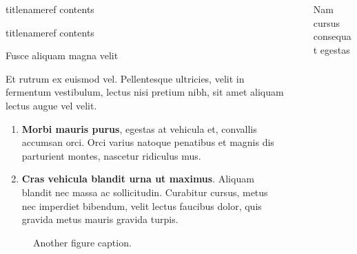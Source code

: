 \documentclass[final]{beamer}
\newlength{\sepwidth}
\newlength{\colwidth}
\newcommand{\separatorcolumn}{\begin{column}{\sepwidth}\end{column}}
\begin{document}
\begin{frame}[t]
\begin{columns}[t]
\begin{column}{\colwidth}
			\begin{lem}{title}{nameref}
				contents
			\end{lem}

			\begin{clm}{title}{nameref}
				contents
			\end{clm}

			\begin{block}{Fusce aliquam magna velit}
				
				Et rutrum ex euismod vel. Pellentesque ultricies, velit in fermentum
				vestibulum, lectus nisi pretium nibh, sit amet aliquam lectus augue vel
				velit. 
				
				\begin{enumerate}
					\item \textbf{Morbi mauris purus}, egestas at vehicula et, convallis
					accumsan orci. Orci varius natoque penatibus et magnis dis parturient
					montes, nascetur ridiculus mus.
					\item \textbf{Cras vehicula blandit urna ut maximus}. Aliquam blandit nec
					massa ac sollicitudin. Curabitur cursus, metus nec imperdiet bibendum,
					velit lectus faucibus dolor, quis gravida metus mauris gravida turpis.
				\end{enumerate}
				
				\begin{figure}
					\centering
					\caption{Another figure caption.}
				\end{figure}
				
			\end{block}
			
		\end{column}
	
		\separatorcolumn
		
		\begin{column}{\colwidth}
			
			\begin{block}{Nam cursus consequat egestas}
				

\end{block}
\end{column}
\end{columns}
\end{frame}
\end{document}
